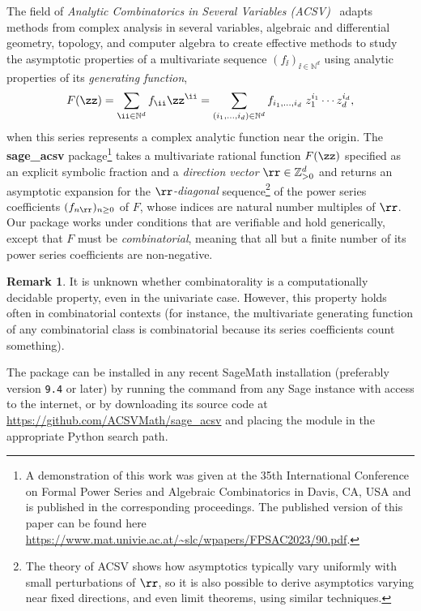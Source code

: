 \documentclass[a4paper]{amsart}
\theoremstyle{definition}
\newtheorem{remark}[theorem]{Remark}
\newcommand{\Z}{{\mathbb Z}}
\newcommand{\N}{{\mathbb N}}
\newcommand{\code}[1]{\texttt{\detokenize{#1}}}
\begin{document}
The field of \emph{Analytic Combinatorics in Several Variables (ACSV)}~\cite{Melczer2021,PemantleWilson2013} adapts methods from complex analysis in several variables, algebraic and differential geometry, topology, and computer algebra to create effective methods to study the asymptotic properties of a multivariate sequence $(f_{\ii})_{\ii \in \N^d}$ using analytic properties of its \emph{generating function}, 
\[ F(\zz) = \sum_{\ii \in \N^d}f_{\ii}\zz^{\ii} = \sum_{(i_1,\ldots,i_d)\in\N^d}f_{i_1,\ldots, i_d} \; z_1^{i_1}\cdots z_d^{i_d} , \]
when this series represents a complex analytic function near the origin. 
The \textbf{sage\_acsv} package\footnote{A demonstration of this work was given at the 35th International Conference on Formal Power Series and Algebraic Combinatorics in Davis, CA, USA and is published in the corresponding proceedings. The published version of this paper can be found here \url{https://www.mat.univie.ac.at/~slc/wpapers/FPSAC2023/90.pdf}.} takes a multivariate rational function $F(\zz)$ specified as an explicit symbolic fraction
and a \emph{direction vector} $\rr \in \Z_{>0}^d$ and returns an asymptotic expansion for the \emph{$\rr$-diagonal} sequence\footnote{The theory of ACSV shows how asymptotics typically vary uniformly with small perturbations of $\rr$, so it is also possible to derive asymptotics varying near fixed directions, and even limit theorems, using similar techniques.} of the power series coefficients $(f_{n\rr})_{n \geq 0}$ of $F$, whose indices are natural number multiples of $\rr$. Our package works under conditions that are verifiable and hold generically, except that $F$ must be \emph{combinatorial}, meaning that all but a finite number of its power series coefficients are non-negative. 

\begin{remark}
It is unknown whether combinatorality is a computationally decidable property, even in the univariate case. However, this property holds often in combinatorial contexts (for instance, the multivariate generating function of any combinatorial class is combinatorial because its series coefficients count something).
\end{remark}

The \code{sage_acsv} package can be installed in any recent SageMath installation
(preferably version \texttt{9.4} or later) by running the command \code{sage -pip install sage-acsv}
from any Sage instance with access to the internet, or by downloading its source code at \url{https://github.com/ACSVMath/sage_acsv} and placing the module in the appropriate Python search path.
\end{document}
